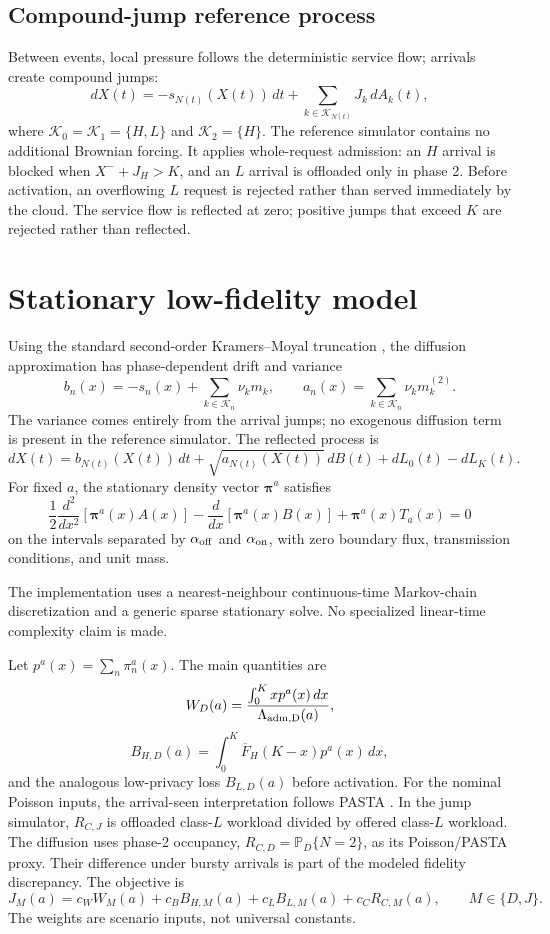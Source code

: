 \documentclass[preprint,12pt]{elsarticle}
\newcommand{\Prob}{\mathbb{P}}
\begin{document}
\subsection{Compound-jump reference process}

Between events, local pressure follows the deterministic service flow; arrivals create compound jumps:
\[
dX(t)=-s_{N(t)}(X(t))\,dt
+\sum_{k\in\mathcal K_{N(t)}}J_k\,dA_k(t),
\]
where $\mathcal K_0=\mathcal K_1=\{H,L\}$ and $\mathcal K_2=\{H\}$. The reference simulator contains no additional Brownian forcing. It applies whole-request admission: an $H$ arrival is blocked when $X^-+J_H>K$, and an $L$ arrival is offloaded only in phase 2. Before activation, an overflowing $L$ request is rejected rather than served immediately by the cloud. The service flow is reflected at zero; positive jumps that exceed $K$ are rejected rather than reflected.

\section{Stationary low-fidelity model}
\label{sec:diffusion}

Using the standard second-order Kramers--Moyal truncation \cite{gardiner2009stochastic}, the diffusion approximation has phase-dependent drift and variance
\[
b_n(x)=-s_n(x)+\sum_{k\in\mathcal K_n}\nu_km_k,
\qquad
a_n(x)=\sum_{k\in\mathcal K_n}\nu_km_k^{(2)}.
\]
The variance comes entirely from the arrival jumps; no exogenous diffusion term is present in the reference simulator.
The reflected process is
\[
dX(t)=b_{N(t)}(X(t))\,dt+\sqrt{a_{N(t)}(X(t))}\,dB(t)
+dL_0(t)-dL_K(t).
\]
For fixed $a$, the stationary density vector $\boldsymbol\pi^a$ satisfies
\[
\frac12\frac{d^2}{dx^2}[\boldsymbol\pi^a(x)A(x)]
-\frac{d}{dx}[\boldsymbol\pi^a(x)B(x)]
+\boldsymbol\pi^a(x)T_a(x)=0
\]
on the intervals separated by $\alpha_{\rm off}$ and $\alpha_{\rm on}$, with zero boundary flux, transmission conditions, and unit mass.

The implementation uses a nearest-neighbour continuous-time Markov-chain discretization and a generic sparse stationary solve. No specialized linear-time complexity claim is made.

Let $p^a(x)=\sum_n\pi_n^a(x)$. The main quantities are
\[
W_D(a)=\frac{\int_0^K xp^a(x)\,dx}{\Lambda_{\rm adm,D}(a)},
\]
\[
B_{H,D}(a)=\int_0^K\overline F_H(K-x)p^a(x)\,dx,
\]
and the analogous low-privacy loss $B_{L,D}(a)$ before activation. For the nominal Poisson inputs, the arrival-seen interpretation follows PASTA \cite{wolff1982pasta}. In the jump simulator, $R_{C,J}$ is offloaded class-$L$ workload divided by offered class-$L$ workload. The diffusion uses phase-2 occupancy, $R_{C,D}=\Prob_D\{N=2\}$, as its Poisson/PASTA proxy. Their difference under bursty arrivals is part of the modeled fidelity discrepancy. The objective is
\[
J_M(a)=c_WW_M(a)+c_BB_{H,M}(a)+c_LB_{L,M}(a)+c_CR_{C,M}(a),
\qquad M\in\{D,J\}.
\]
The weights are scenario inputs, not universal constants.
\end{document}
